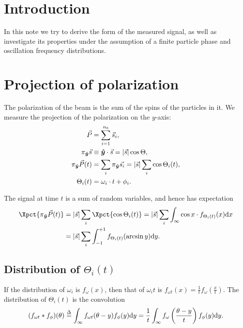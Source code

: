 \documentclass{article}
\newcommand{\nb}{{n_b}}
\newcommand{\uvec}[1]{\boldsymbol{\hat{#1}}}
\newcommand{\abs}[1]{\vert#1\vert}
\newcommand{\proj}[2]{\pi_{\uvec{#2}}\vec{#1}}
\newcommand{\deq}{\overset{\Delta}{=}}
\begin{document}
\section*{Introduction}
In this note we try to derive the form of the measured signal, as well as investigate its properties under the assumption of a finite particle phase and oscillation frequency distributions.

\section{Projection of polarization}
The polarization of the beam is the sum of the spins of the particles in it. We measure the projection of the polarization on the $y$-axis:
\begin{align}
	\vec{P} &= \sum_{i=1}^\nb \vec{s}_i, \notag\\
	\proj{s}{y} &\equiv \uvec{y}\cdot\vec{s} = \abs{\vec{s}}\cos\Theta, \notag\\
	\proj{P}{y}(t) &= \sum_i \proj{s_i}{y} = \abs{\vec{s}}\sum_i \cos\Theta_i(t), \label{eq:SumSpins}\\
	\Theta_i(t) &= \omega_i\cdot t + \phi_i.\notag
\end{align}

The signal at time $t$ is a sum of random variables, and hence has expectation 
\begin{align*}
	\Xpct{\proj{P}{y}(t)} &= \abs{\vec{s}}\sum_i\Xpct{\cos\Theta_i(t)} = \abs{\vec{s}}\sum_i\int_{\infty}\cos x \cdot f_{\Theta_i(t)}(x)\td x \\
	&= \abs{\vec{s}}\sum_i\int_{-1}^{+1} f_{\Theta_i(t)}(\arcsin y)\td y.
\end{align*}

\subsection{Distribution of $\Theta_i(t)$}
\newcommand{\f}[1]{f_{#1}}
\newcommand{\fw}{\f{\omega}}
\newcommand{\fp}{\f{\phi}}
\newcommand{\fwt}{\f{\omega t}}
\newcommand{\ftht}{\f{\Theta(t)}}

\newcommand{\wycoef}{G}
\newcommand{\dy}{\Delta\gamma}

If the distribution of $\omega_i$ is $\fw(x)$, then that of $\omega_i t$ is $\fwt(x) = \frac{1}{t}\fw(\frac{x}{t})$. The distribution of $\Theta_i(t)$ is the convolution 
\[
	(\fwt*\fp)(\theta) \deq \int_\infty \fwt(\theta-y)\fp(y)\td y = \frac1t \int_\infty \fw\bkt{\frac{\theta-y}{t}}\fp(y)\td y.
\]
\end{document}
